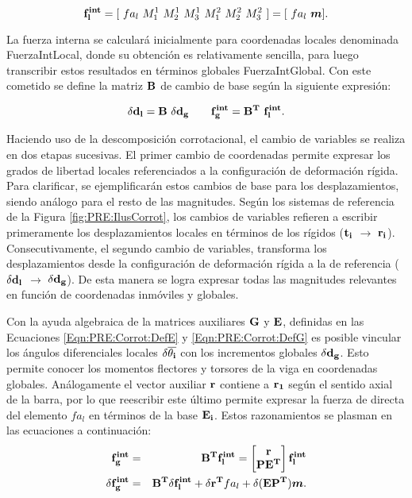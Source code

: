 \begin{equation}\label{Eqn:PRE:FuerzElem}
\bf{ f_l^{int}} =\text{$[~fa_l ~M^1_1~ M^1_2~ M^1_3~ M^2_1~ M^2_2~ M^2_3~]$} = [\text{$~fa_l$}~\boldsymbol{m}].
\end{equation}

La fuerza interna se calculará inicialmente para coordenadas locales denominada \gls{FuerzaIntLocal}, donde su obtención es relativamente sencilla, para luego transcribir estos resultados en términos globales \gls{FuerzaIntGlobal}. Con este cometido se define la matriz $\bf{B}$ de cambio de base según la siguiente expresión:

\begin{equation}\label{Eqn:PRE:CambioCoord}
	\bf{\delta d_l}=\bf{B}~\bf{\delta d_g} ~~~~~~ 	\bf{f_g^{int}}=\bf{B}^T~\bf{ f_l^{int}}.
\end{equation}

Haciendo uso de la descomposición corrotacional, el cambio de variables se realiza en dos etapas sucesivas. El primer cambio de coordenadas permite expresar los grados de libertad locales referenciados a la configuración de deformación rígida. Para clarificar, se ejemplificarán estos cambios de base para los desplazamientos, siendo análogo para el resto de las magnitudes. Según los sistemas de referencia de la Figura \ref{fig:PRE:IlusCorrot}, los cambios de variables refieren a escribir primeramente los desplazamientos locales en términos de los rígidos ($\bf{t_i}$ $\rightarrow$ $\bf{r_i}$). Consecutivamente, el segundo cambio de variables, transforma los desplazamientos desde la configuración de deformación rígida a la de referencia ($\delta \bf{d_l}$ $\rightarrow$ $\delta \bf{d_g}$). De esta manera se logra expresar todas las magnitudes relevantes en función de coordenadas inmóviles y globales.

Con la ayuda algebraica de la matrices auxiliares $\bf{G}$ y $\bf{E}$, definidas en las Ecuaciones \eqref{Eqn:PRE:Corrot:DefE} y \eqref{Eqn:PRE:Corrot:DefG} es posible vincular los ángulos diferenciales locales $\delta\bf{\overline{\theta_i}}$ con los incrementos globales $\delta \bf{d_g}$. Esto permite conocer los momentos flectores y torsores de la viga en coordenadas globales. Análogamente el vector auxiliar $\bf{r}$ contiene a $\bf{r}_1$ según el sentido axial de la barra, por lo que reescribir este último permite expresar la fuerza de directa del elemento $fa_l$ en términos de la base $\bf{E_i}$. Estos razonamientos se plasman en las ecuaciones a continuación:
\begin{eqnarray}\label{Eqn:PRE:FuerzaInterna}
	\bf{f_g^{int}}&=&\bf{B}^T\bf{f_l^{int}}= \begin{bmatrix}
		\bf{r}\\
		\bf{PE^T}
	\end{bmatrix}\bf{ f_l^{int}}\\
    \label{Eqn:PRE:DifFuerzaInterna}
	\delta\bf{f_g^{int}}&=&\bf{B}^T\delta\bf{f_l^{int}}+\delta\bf{r}^T \text{$fa_{l}$}+\delta(\bf{EP^T}) \boldsymbol{m}.
\end{eqnarray}

